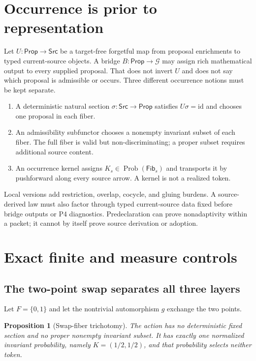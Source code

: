 \documentclass[11pt]{article}
\newtheorem{proposition}{Proposition}
\newcommand{\Src}{\mathsf{Src}}
\newcommand{\Prop}{\mathsf{Prop}}
\newcommand{\Fib}{\mathsf{Fib}}
\newcommand{\Prob}{\operatorname{Prob}}
\begin{document}
\section{Occurrence is prior to representation}

Let $U:\Prop\to\Src$ be a target-free forgetful map from proposal
enrichments to typed current-source objects.  A bridge
$B:\Prop\to\mathcal G$ may assign rich mathematical output to every supplied
proposal.  That does not invert $U$ and does not say which proposal is
admissible or occurs.  Three different occurrence notions must be kept
separate.

\begin{enumerate}[label=(\roman*)]
\item A deterministic natural section $\sigma:\Src\to\Prop$ satisfies
      $U\sigma=\mathrm{id}$ and chooses one proposal in each fiber.
\item An admissibility subfunctor chooses a nonempty invariant subset of each
      fiber.  The full fiber is valid but non-discriminating; a proper subset
      requires additional source content.
\item An occurrence kernel assigns $K_s\in\Prob(\Fib_s)$ and transports it by
      pushforward along every source arrow.  A kernel is not a realized token.
\end{enumerate}

Local versions add restriction, overlap, cocycle, and gluing burdens.  A
source-derived law must also factor through typed current-source data fixed
before bridge outputs or P4 diagnostics.  Predeclaration can prove
nonadaptivity within a packet; it cannot by itself prove source derivation or
adoption.

\section{Exact finite and measure controls}

\subsection{The two-point swap separates all three layers}

Let $F=\{0,1\}$ and let the nontrivial automorphism $g$ exchange the two
points.

\begin{proposition}[Swap-fiber trichotomy]
The action has no deterministic fixed section and no proper nonempty
invariant subset.  It has exactly one normalized invariant probability,
namely $K=(1/2,1/2)$, and that probability selects neither token.
\end{proposition}
\end{document}
